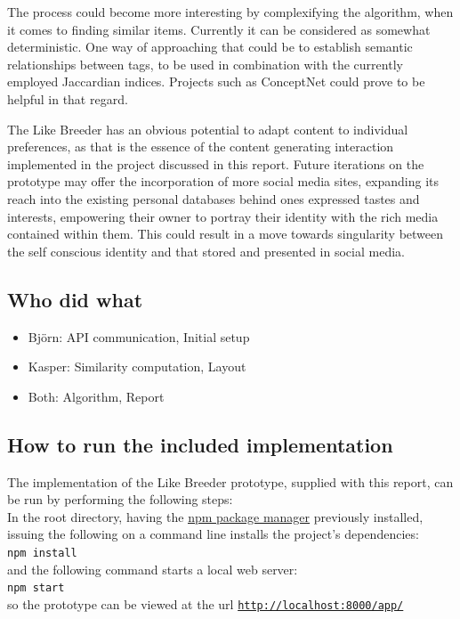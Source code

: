 \documentclass[conference]{IEEETran}
\begin{document}
The process could become more interesting by complexifying the algorithm, when it comes to finding similar items.  Currently it can be considered as somewhat deterministic.  One way of approaching that could be to establish semantic relationships between tags, to be used in combination with the currently employed Jaccardian indices.  Projects such as ConceptNet \cite{speer2013conceptnet} could prove to be helpful in that regard.




The Like Breeder has an obvious potential to adapt content to individual preferences, as that is the essence of the content generating interaction implemented in the project discussed in this report.  Future iterations on the prototype may offer the incorporation of more social media sites, expanding its reach into the existing personal databases behind ones expressed tastes and interests, empowering their owner to portray their identity with the rich media contained within them.  This could result in a move towards singularity between the self conscious identity and that stored and presented in social media.



\subsection{Who did what}
\begin{itemize}
\item Björn: API communication, Initial setup
\item Kasper: Similarity computation, Layout 
\item Both: Algorithm, Report
\end{itemize}


\subsection{How to run the included implementation}
The implementation of the Like Breeder prototype, supplied with this report, can be run by performing the following steps:\\
In the root directory, having the \underline{\href{https://www.npmjs.com}{npm package manager}} previously installed, issuing the following on a command line installs the project's dependencies:\\
\texttt{npm install}\\
and the following command starts a local web server: \\
\texttt{npm start}\\
so the prototype can be viewed at the url \texttt{\url{http://localhost:8000/app/}}

\newpage



\end{document}
